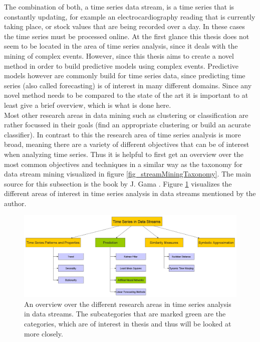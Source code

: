 The combination of both, a time series data stream, is a time series that is constantly updating, for example an electrocardiography reading that is currently taking place, or stock values that are being recorded over a day. In these cases the time series must be processed online. \newline
At the first glance this thesis does not seem to be located in the area of time series analysis, since it deals with the mining of complex events. However, since this thesis aims to create a novel method in order to build predictive models using complex events. Predictive models however are commonly build for time series data, since predicting time series (also called forecasting) is of interest in many different domains. Since any novel method needs to be compared to the state of the art it is important to at least give a brief overview, which is what is done here.\\
Most other research areas in data mining such as clustering or classification are rather focussed in their goals (find an appropriate clustering or build an acurate classifier). In contrast to this the research area of time series analysis is more broad, meaning there are a variety of different objectives that can be of interest when analyzing time series. Thus it is helpful to first get an overview over the most common objectives and techniques in a similar way as the taxonomy for data stream mining visualized in figure \ref{fig_streamMiningTaxonomy}. The main source for this subsection is the book by J. Gama \cite{gama2010knowledge}. Figure \ref{fig_timeSeriesInDataStreamsOverview} visualizes the different areas of interest in time series analysis in data streams mentioned by the author.

\begin{figure}[h]
	\centering
  	\includegraphics[width=\textwidth]{timeSeriesInDataStreamsOverview}
	\caption{An overview over the different research areas in time series analysis in data streams. The subcategories that are marked green are the categories, which are of interest in thesis and thus will be looked at more closely.}
	\label{fig_timeSeriesInDataStreamsOverview}
\end{figure}

